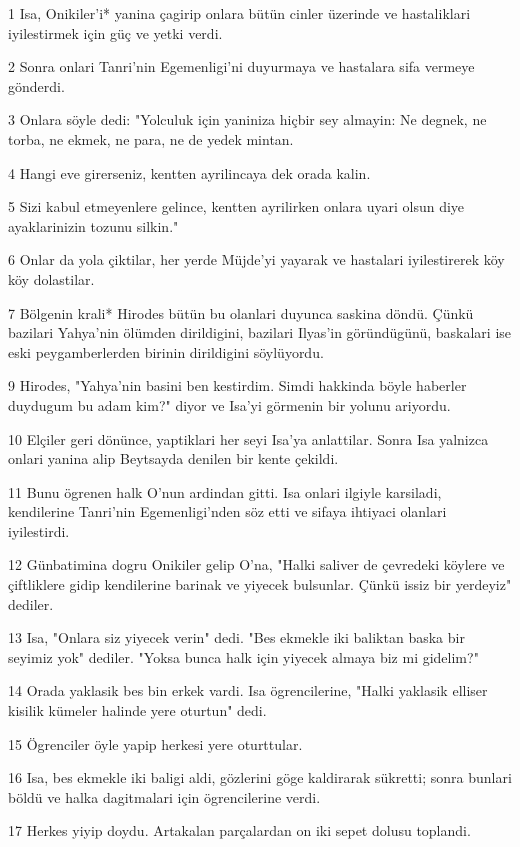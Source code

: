 \par 1 Isa, Onikiler'i* yanina çagirip onlara bütün cinler üzerinde ve hastaliklari iyilestirmek için güç ve yetki verdi.
\par 2 Sonra onlari Tanri'nin Egemenligi'ni duyurmaya ve hastalara sifa vermeye gönderdi.
\par 3 Onlara söyle dedi: "Yolculuk için yaniniza hiçbir sey almayin: Ne degnek, ne torba, ne ekmek, ne para, ne de yedek mintan.
\par 4 Hangi eve girerseniz, kentten ayrilincaya dek orada kalin.
\par 5 Sizi kabul etmeyenlere gelince, kentten ayrilirken onlara uyari olsun diye ayaklarinizin tozunu silkin."
\par 6 Onlar da yola çiktilar, her yerde Müjde'yi yayarak ve hastalari iyilestirerek köy köy dolastilar.
\par 7 Bölgenin krali* Hirodes bütün bu olanlari duyunca saskina döndü. Çünkü bazilari Yahya'nin ölümden dirildigini, bazilari Ilyas'in göründügünü, baskalari ise eski peygamberlerden birinin dirildigini söylüyordu.
\par 9 Hirodes, "Yahya'nin basini ben kestirdim. Simdi hakkinda böyle haberler duydugum bu adam kim?" diyor ve Isa'yi görmenin bir yolunu ariyordu.
\par 10 Elçiler geri dönünce, yaptiklari her seyi Isa'ya anlattilar. Sonra Isa yalnizca onlari yanina alip Beytsayda denilen bir kente çekildi.
\par 11 Bunu ögrenen halk O'nun ardindan gitti. Isa onlari ilgiyle karsiladi, kendilerine Tanri'nin Egemenligi'nden söz etti ve sifaya ihtiyaci olanlari iyilestirdi.
\par 12 Günbatimina dogru Onikiler gelip O'na, "Halki saliver de çevredeki köylere ve çiftliklere gidip kendilerine barinak ve yiyecek bulsunlar. Çünkü issiz bir yerdeyiz" dediler.
\par 13 Isa, "Onlara siz yiyecek verin" dedi. "Bes ekmekle iki baliktan baska bir seyimiz yok" dediler. "Yoksa bunca halk için yiyecek almaya biz mi gidelim?"
\par 14 Orada yaklasik bes bin erkek vardi. Isa ögrencilerine, "Halki yaklasik elliser kisilik kümeler halinde yere oturtun" dedi.
\par 15 Ögrenciler öyle yapip herkesi yere oturttular.
\par 16 Isa, bes ekmekle iki baligi aldi, gözlerini göge kaldirarak sükretti; sonra bunlari böldü ve halka dagitmalari için ögrencilerine verdi.
\par 17 Herkes yiyip doydu. Artakalan parçalardan on iki sepet dolusu toplandi.
